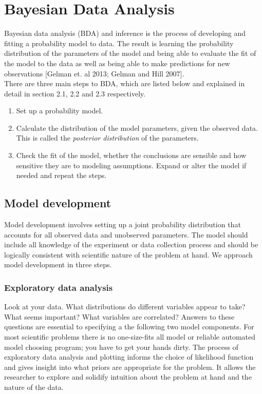 \documentclass{article}
\begin{document}
\section{Bayesian Data Analysis}
Bayesian data analysis (BDA) and inference is the process of developing and fitting a probability model to data. The result is learning the probability distribution of the parameters of the model and being able to evaluate the fit of the model to the data as well as being able to make predictions for new observations [Gelman et. al 2013; Gelman and Hill 2007].
\\
There are three main steps to BDA, which are listed below and explained in detail in section 2.1, 2.2 and 2.3 respectively.
\begin{enumerate}
\item{Set up a probability model.}
\item{Calculate the distribution of the model parameters, given the observed data. This is called the \textit{posterior distribution} of the parameters.}
\item{Check the fit of the model, whether the conclusions are sensible and how sensitive they are to modeling assumptions. Expand or alter the model if needed and repeat the steps.}
\end{enumerate}

\subsection{Model development}
Model development involves setting up a joint probability distribution that accounts for all observed data and unobserved parameters. The model should include all knowledge of the experiment or data collection process and should be logically consistent with scientific nature of the problem at hand. We approach model development in three steps.

\subsubsection{Exploratory data analysis}
 Look at your data.  What distributions do different variables appear to take?  What seems important?  What variables are correlated?  Answers to these questions are essential to specifying a the following two model components.  For most scientific problems there is no one-size-fits all model or reliable automated model choosing program; you have to get your hands dirty. The process of exploratory data analysis and plotting informs the choice of likelihood function and gives insight into what priors are appropriate for the problem. It allows the researcher to explore and solidify intuition about the problem at hand and the nature of the data.
\end{document}
